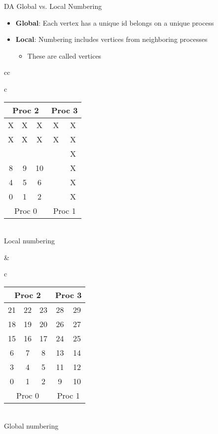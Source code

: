 \begin{frame}{DA Global vs. Local Numbering}

\begin{itemize}
  \item {\bf Global}: Each vertex has a unique id belongs on a unique process

  \item {\bf Local}: Numbering includes vertices from neighboring processes
  \begin{itemize}
    \item These are called  vertices
  \end{itemize}
\end{itemize}

\begin{center}
\begin{tabular}{cc}
\begin{tabular}{c}
\begin{tabular}{|ccc|cc|}
\hline
\multicolumn{3}{|c|}{Proc 2} & \multicolumn{2}{c|}{Proc 3} \\
\hline
 X &  X &  X &  X &  X \\
 X &  X &  X &  X &  X \\
\cyan{12} & \cyan{13} & \cyan{14} & \cyan{15} &  X \\
\hline
 8 &  9 & 10 & \cyan{11} &  X \\
 4 &  5 &  6 &  \cyan{7} &  X \\
 0 &  1 &  2 &  \cyan{3} &  X \\
\hline
\multicolumn{3}{|c|}{Proc 0} & \multicolumn{2}{c|}{Proc 1} \\
\hline
\end{tabular} \\
Local numbering
\end{tabular}
& 
\begin{tabular}{c}
\begin{tabular}{|ccc|cc|}
\hline
\multicolumn{3}{|c|}{Proc 2} & \multicolumn{2}{c|}{Proc 3} \\
\hline
21 & 22 & 23 & 28 & 29 \\
18 & 19 & 20 & 26 & 27 \\
15 & 16 & 17 & 24 & 25 \\
\hline
 6 &  7 &  8 & 13 & 14 \\
 3 &  4 &  5 & 11 & 12 \\
 0 &  1 &  2 &  9 & 10 \\
\hline
\multicolumn{3}{|c|}{Proc 0} & \multicolumn{2}{c|}{Proc 1} \\
\hline
\end{tabular}\\
Global numbering
\end{tabular}
\end{tabular}
\end{center}
\end{frame}

